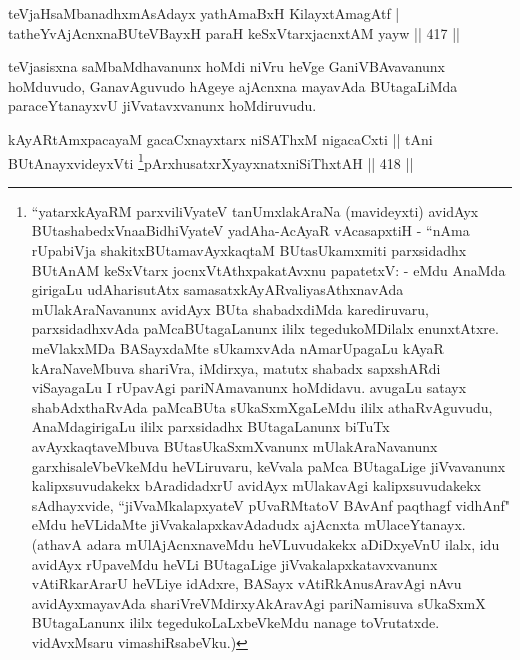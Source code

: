 
\begin{shl}
teVjaHsaMbanadhxmAsAdayx yathA\s maBxH KilayxtAmagAtf |
tatheYvAjAcnxnaBUteVBayxH paraH keSxVtarxjacnxtAM yayw \hfill || 417 ||
\end{shl}

\begin{artha}
teVjasisxna saMbaMdhavanunx hoMdi niVru heVge GaniVBAvavanunx hoMduvudo, GanavAguvudo hAgeye ajAcnxna mayavAda BUtagaLiMda paraceYtanayxvU jiVvatavxvanunx hoMdiruvudu.
\end{artha}


\begin{shl}
kAyARtAmx\s pacayaM gacaCxnayxtarx niSAThxM nigacaCxti ||
tAni BUtAnayxvideyxVti \footnote{``yatarxkAyaRM parxviliVyateV tanUmxlakAraNa (mavideyxti) avidAyx BUtashabedxVna\break aBidhiVyateV yadAha-AcAyaR vAcasapxtiH - ``nAma rUpabiVja shakitxBUtamavAyxkaqtaM BUtasUkamxmiti parxsidadhx BUtAnAM keSxVtarx jocnxVtAthxpakatAvxnu papatetxV: - eMdu AnaMda girigaLu udAharisutAtx samasatxkAyARvaliyasAthxnavAda mUlakAraNavanunx avidAyx BUta shabadxdiMda karediruvaru, parxsidadhxvAda paMcaBUtagaLanunx ililx tegedukoMDilalx enunxtAtxre. meVlakxMDa BASayxdaMte sUkamxvAda nAmarUpagaLu kAyaR kAraNaveMbuva shariVra, iMdirxya, matutx shabadx sapxshARdi viSayagaLu I rUpavAgi pariNAmavanunx hoMdidavu. avugaLu satayx shabAdxthaRvAda paMcaBUta sUkaSxmXgaLeMdu ililx athaRvAguvudu, AnaMdagirigaLu ililx parxsidadhx BUtagaLanunx biTuTx avAyxkaqtaveMbuva BUtasUkaSxmXvanunx mUlakAraNavanunx garxhisaleVbeVkeMdu heVLiruvaru, keVvala paMca BUtagaLige jiVvavanunx kalipxsuvudakekx bAradidadxrU avidAyx mUlakavAgi kalipxsuvudakekx sAdhayxvide, ``jiVvaMkalapxyateV pUvaRMtatoV BAvAnf paqthagf vidhAnf" eMdu heVLidaMte jiVvakalapxkavAdadudx ajAcnxta mUlaceYtanayx. (athavA adara mUlAjAcnxnaveMdu heVLuvudakekx aDiDxyeVnU ilalx, idu avidAyx rUpaveMdu heVLi BUtagaLige jiVvakalapxkatavxvanunx vAtiRkarArarU heVLiye idAdxre, BASayx vAtiRkAnusAravAgi nAvu avidAyxmayavAda shariVreVMdirxyAkAravAgi pariNamisuva sUkaSxmX BUtagaLanunx ililx tegedukoLaLxbeVkeMdu nanage toVrutatxde. vidAvxMsaru vimashiRsabeVku.)}pArxhusatxrXyayxnatxniSiThxtAH \hfill || 418 ||
\end{shl}

